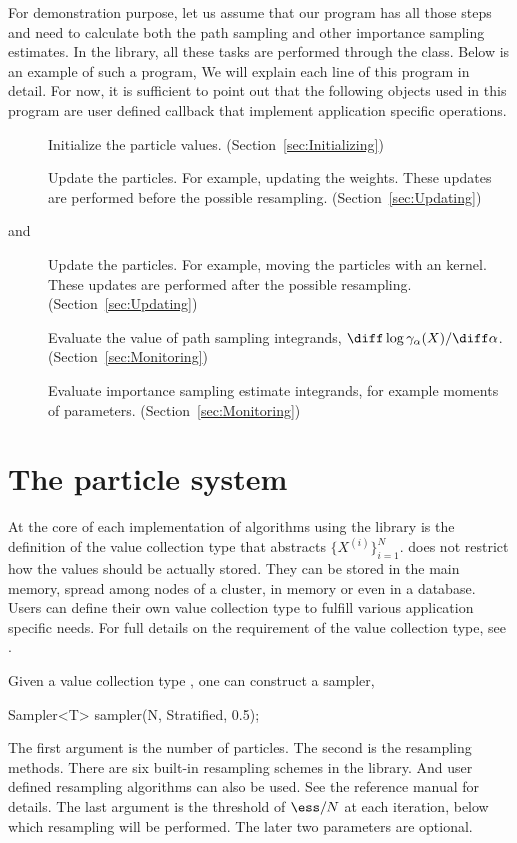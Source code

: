 For demonstration purpose, let us assume that our program has all those steps and need to calculate both the path sampling and other importance sampling estimates. In the \vsmc library, all these tasks are performed through the  class. Below is an example of such a program,  We will explain each line of this program in detail. For now, it is sufficient to point out that the following objects used in this program are user defined callback that implement application specific operations.
\begin{description}
  \item[] Initialize the particle values. (Section~\ref{sec:Initializing})
  \item[] Update the particles. For example, updating the weights. These updates are performed before the possible resampling. (Section~\ref{sec:Updating})
  \item[ and ] Update the particles. For example, moving the particles with an \mcmc kernel. These updates are performed after the possible resampling. (Section~\ref{sec:Updating})
  \item[] Evaluate the value of path sampling integrands, $\diff\log\gamma_{\alpha}(X)/\diff\alpha$. (Section~\ref{sec:Monitoring})
  \item[] Evaluate importance sampling estimate integrands, for example moments of parameters. (Section~\ref{sec:Monitoring})
\end{description}

\section{The particle system}
\label{sec:The particle system}

At the core of each implementation of \smc algorithms using the \vsmc library is the definition of the value collection type that abstracts $\{X^{(i)}\}_{i=1}^N$. \vsmc does not restrict how the values should be actually stored. They can be stored in the main memory, spread among nodes of a cluster, in \gpu memory or even in a database. Users can define their own value collection type to fulfill various application specific needs. For full details on the requirement of the value collection type, see \cite{vsmcjss}.

Given a value collection type , one can construct a sampler,
\begin{cppcode}
Sampler<T> sampler(N, Stratified, 0.5);
\end{cppcode}
The first argument is the number of particles. The second is the resampling methods. There are six built-in resampling schemes in the library. And user defined resampling algorithms can also be used. See the reference manual for details. The last argument is the threshold of $\ess/N$ at each iteration, below which resampling will be performed. The later two parameters are optional.

